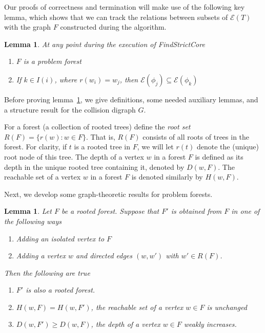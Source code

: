 \documentclass[11pt,reqno]{amsart}
\newtheorem{lemma}[thm]{Lemma}
\theoremstyle{definition}
\numberwithin{equation}{section}
\newcommand{\pre}{\phi}
\newcommand{\sub}{\subseteq}
\newcommand{\fix}{\mathcal{E}}
\newcommand{\coll}{I}
\newcommand{\reach}{H}
\newcommand{\forest}{F}
\newcommand{\roott}{R}
\newcommand{\depth}{D}
\begin{document}
Our proofs of correctness and termination will make use of the following key lemma, which shows that we can track the relations between subsets of $\fix(T)$ with the graph $F$ constructed during the algorithm.

\begin{lemma} \label{lemma:key}
At any point during the execution of FindStrictCore 
\begin{enumerate}
\item $\forest$ is a problem forest \label{convlemma:forest}
\item If $k \in \coll(i)$, where $r(w_i) = w_j$, then $\fix(\pre_j) \sub \fix(\pre_k)$ \label{convlemma:coll}
\end{enumerate}
\end{lemma}

Before proving lemma~\ref{lemma:key}, we give definitions, some needed auxiliary lemmas, and a structure result for the collision digraph $G$. 

For a forest (a collection of rooted trees) define the \emph{root set} $\roott(\forest) = \{r(w): w\in F\}$. 
That is, $\roott(\forest)$ consists of all roots of trees in the forest.
For clarity, if $t$ is a rooted tree in $\forest$, we will let $r(t)$ denote the (unique) root node of this tree.
The depth of a vertex $w$ in a forest $\forest$ is defined as its depth in the unique rooted tree containing it, denoted by $\depth(w, \forest)$.
The reachable set of a vertex $w$ in a forest $\forest$ is denoted similarly by $\reach(w, \forest)$.

Next, we develop some graph-theoretic results for problem forests. 

\begin{lemma} \label{lemma:forest}
Let $\forest$ be a rooted forest. 
Suppose that $\forest'$ is obtained from $\forest$ in one of the following ways 
\begin{enumerate}
\item Adding an isolated vertex to $\forest$ \label{forest:solo}
\item Adding a vertex $w$ and directed edges $(w,w')$ with $w' \in \roott(\forest)$. \label{forest:child}
\end{enumerate}
Then the following are true  
\begin{enumerate}
\item[(i)] $\forest'$ is also a rooted forest. 
\item[(ii)] $\reach(w,\forest) = \reach(w,\forest')$, the reachable set of a vertex $w \in \forest$ is unchanged
\item[(iii)] $\depth(w,\forest') \geq \depth(w,\forest)$, the depth of a vertex $w \in \forest$ weakly increases.
\end{enumerate}


\end{lemma}
\end{document}
